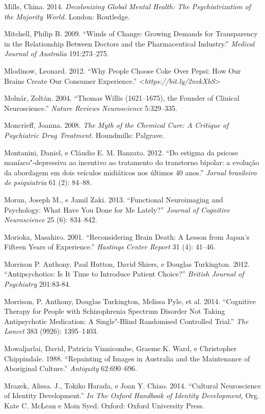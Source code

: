 {\begin{Parskip}
Mills, China. 2014. \emph{Decolonizing Global Mental Health: The
Psychiatrization of the Majority World.} London: Routledge.

Mitchell, Philip B. 2009. ``Winds of Change: Growing Demands for
Transparency in the Relationship Between Doctors and the Pharmaceutical
Industry.'' \emph{Medical Journal of Australia} 191:273--275.

Mlodinow, Leonard. 2012. ``Why People Choose Coke Over Pepsi: How Our
Brains Create Our Consumer Experience.''
\textless{}\emph{https://bit.ly/2nvkXbS}\textgreater{}

Molnár, Zoltán. 2004. ``Thomas Willis (1621--1675), the Founder of
Clinical Neuroscience.'' \emph{Nature Reviews Neuroscience} 5:329--335.

Moncrieff, Joanna. 2008. \emph{The Myth of the Chemical Cure: A Critique
of Psychiatric Drug Treatment.} Houndmills: Palgrave.

Montanini, Daniel, e Cláudio E. M. Banzato. 2012. ``Do estigma da
psicose maníaco"-depressiva ao incentivo ao tratamento do transtorno
bipolar: a evolução da abordagem em dois veículos midiáticos nos últimos
40 anos.'' \emph{Jornal brasileiro de psiquiatria} 61 (2): 84--88.

Moran, Joseph M., e Jamil Zaki. 2013. ``Functional Neuroimaging and
Psychology: What Have You Done for Me Lately?'' \emph{Journal of
Cognitive Neuroscience} 25 (6): 834--842.

Morioka, Masahiro. 2001. ``Reconsidering Brain Death: A Lesson from
Japan's Fifteen Years of Experience.'' \emph{Hastings Center Report} 31
(4): 41--46.

Morrison P. Anthony, Paul Hutton, David Shiers, e Douglas Turkington.
2012. ``Antipsychotics: Is It Time to Introduce Patient Choice?''
\emph{British Journal of Psychiatry} 201:83-84.

Morrison, P. Anthony, Douglas Turkington, Melissa Pyle, et al. 2014.
``Cognitive Therapy for People with Schizophrenia Spectrum Disorder Not
Taking Antipsychotic Medication: A Single"-Blind Randomised Controlled
Trial.'' \emph{The Lancet} 383 (9926): 1395--1403.

Mowaljarlai, David, Patricia Vinnicombe, Graeme K. Ward, e Christopher
Chippindale. 1988. ``Repainting of Images in Australia and the
Maintenance of Aboriginal Culture.'' \emph{Antiquity} 62:690--696.

Mrazek, Alissa. J., Tokiko Harada, e Joan Y. Chiao. 2014. ``Cultural
Neuroscience of Identity Development.'' \emph{In The Oxford Handbook of
Identity Development}, Org. Kate C. McLean e Moin Syed. Oxford: Oxford
University Press.


\end{Parskip}}
